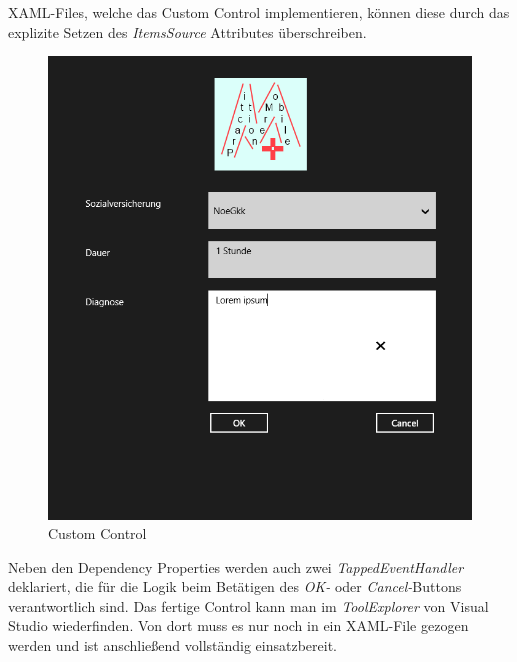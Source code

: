 \documentclass[a4paper,bibtotoc,oneside]{scrbook}
\begin{document}
XAML-Files, welche das Custom Control implementieren, können diese durch das explizite Setzen des \textit{ItemsSource} Attributes überschreiben.
\newline
\newline
\begin{figure}[htbp]
\centering
\includegraphics[scale=0.7]{images/customcontrol.png}
\caption[Custom Control]{Custom Control}\label{img:customcontrol}
\end{figure}
\newline
Neben den Dependency Properties werden auch zwei \textit{TappedEventHandler} deklariert, die für die Logik beim Betätigen des \textit{OK-} oder \textit{Cancel-}Buttons verantwortlich sind.
\newline
\newline
Das fertige Control kann man im \textit{ToolExplorer} von Visual Studio wiederfinden. Von dort muss es nur noch in ein XAML-File gezogen werden und ist anschließend vollständig einsatzbereit.

\end{document}
